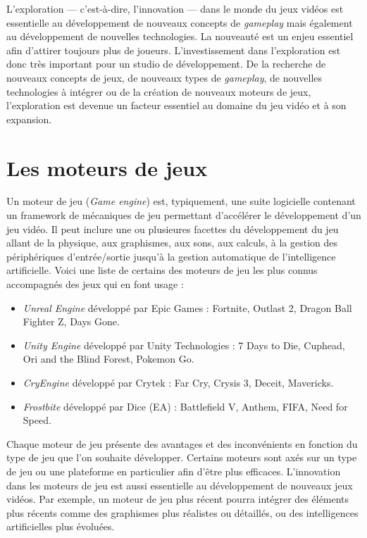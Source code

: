 L'exploration --- c'est-\`a-dire, l'innovation --- dans le monde du jeux vidéos est essentielle au développement de nouveaux concepts de \emph{gameplay} mais également au d\'eveloppement de nouvelles technologies. La nouveauté est un enjeu essentiel afin d'attirer toujours plus de joueurs. L'investissement dans l'exploration est donc très important pour un studio de développement. De la recherche de nouveaux concepts de jeux, de nouveaux types de \emph{gameplay}, de nouvelles technologies à intégrer ou de la création de nouveaux moteurs de jeux, l'exploration est devenue un facteur essentiel au domaine du jeu vidéo et à son expansion.



\section{Les moteurs de jeux}
Un moteur de jeu (\emph{Game engine}) est, typiquement, une suite logicielle contenant un framework de mécaniques de jeu permettant d'accélérer le développement d'un jeu vidéo. Il peut inclure une ou plusieures facettes du développement du jeu allant de la physique, aux graphismes, aux sons, aux calculs, à la gestion des périphériques d'entrée/sortie jusqu'à la gestion automatique de l'intelligence artificielle. Voici une liste de certains des moteurs de jeu les plus connus accompagnés des jeux qui en font usage : 
\begin{itemize}
    \item \emph{Unreal Engine} \cite{UnrealEngine} développé par Epic Games : Fortnite, Outlast 2, Dragon Ball Fighter Z, Days Gone.
    \item \emph{Unity Engine} \cite{UnityEngine} développé par Unity Technologies : 7 Days to Die, Cuphead, Ori and the Blind Forest, Pokemon Go.
    \item \emph{CryEngine} \cite{CryEngine} développé par Crytek : Far Cry, Crysis 3, Deceit, Mavericks.
    \item \emph{Frostbite} \cite{FrostbiteEngine} développé par Dice (EA) : Battlefield V, Anthem, FIFA, Need for Speed.
\end{itemize}

Chaque moteur de jeu présente des avantages et des inconvénients en fonction du type de jeu que l'on souhaite développer. Certains moteurs sont axés sur un type de jeu ou une plateforme en particulier afin d'être plus efficaces. 
%
%
L'innovation dans les moteurs de jeu est aussi essentielle au développement de nouveaux jeux vidéos. 
%
Par exemple, un moteur de jeu plus récent pourra intégrer des éléments plus récents comme des graphismes plus réalistes ou détaillés, ou des intelligences artificielles plus évoluées.

